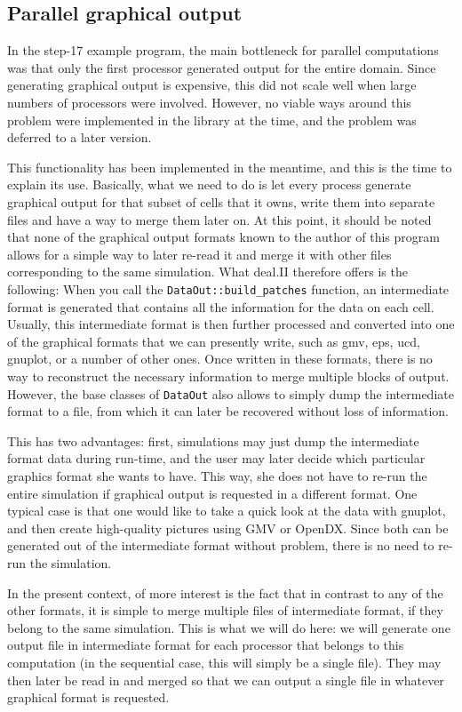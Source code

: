 \documentclass{article}
\begin{document}
\subsection*{Parallel graphical output}

In the step-17 example program, the main bottleneck for parallel computations
was that only the first processor generated output for the entire domain.
Since generating graphical output is expensive, this did not scale well when
large numbers of processors were involved. However, no viable ways around this
problem were implemented in the library at the time, and the problem was
deferred to a later version.

This functionality has been implemented in the meantime, and this is the time
to explain its use. Basically, what we need to do is let every process
generate graphical output for that subset of cells that it owns, write them
into separate files and have a way to merge them later on. At this point, it
should be noted that none of the graphical output formats known to the author
of this program allows for a simple way to later re-read it and merge it with
other files corresponding to the same simulation. What deal.II therefore
offers is the following: When you call the \texttt{DataOut::build\_patches}
function, an intermediate format is generated that contains all the
information for the data on each cell. Usually, this intermediate format is
then further processed and converted into one of the graphical formats that we
can presently write, such as gmv, eps, ucd, gnuplot, or a number of other
ones. Once written in these formats, there is no way to reconstruct the
necessary information to merge multiple blocks of output. However, the base
classes of \texttt{DataOut} also allows to simply dump the intermediate format to a
file, from which it can later be recovered without loss of information.

This has two advantages: first, simulations may just dump the intermediate
format data during run-time, and the user may later decide which particular
graphics format she wants to have. This way, she does not have to re-run the
entire simulation if graphical output is requested in a different format. One
typical case is that one would like to take a quick look at the data with
gnuplot, and then create high-quality pictures using GMV or OpenDX. Since both
can be generated out of the intermediate format without problem, there is no
need to re-run the simulation.

In the present context, of more interest is the fact that in contrast to any
of the other formats, it is simple to merge multiple files of intermediate
format, if they belong to the same simulation. This is what we will do here:
we will generate one output file in intermediate format for each processor
that belongs to this computation (in the sequential case, this will simply be
a single file). They may then later be read in and merged so that we can
output a single file in whatever graphical format is requested.
\end{document}
